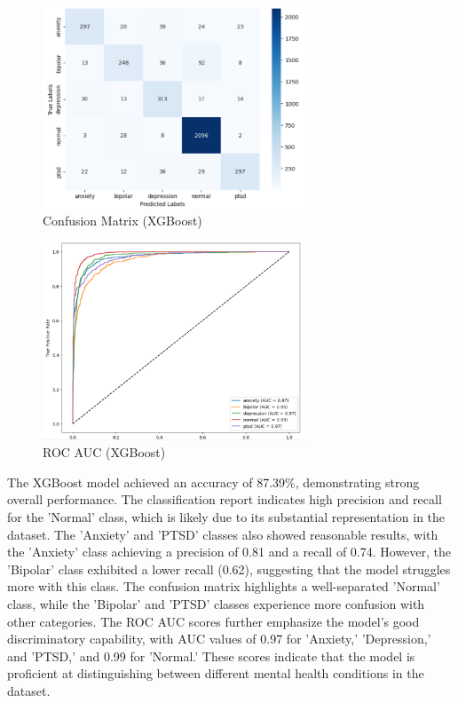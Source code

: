 \vspace{0.25em}

\begin{figure}[h!]  
    \centering
    \includegraphics[width=0.7\textwidth]{Images/XG Confusion Matrix.png}  
    \caption{Confusion Matrix (XGBoost)}
    \label{XGCM}  %
\end{figure}

\begin{figure}[h!]  
    \centering
    \includegraphics[width=0.7\textwidth]{Images/XG ROC.png}  
    \caption{ROC AUC (XGBoost)}
    \label{XGrOC}  %
\end{figure}

\noindent
The XGBoost model achieved an accuracy of 87.39\%, demonstrating strong overall performance. The classification report indicates high precision and recall for the 'Normal' class, which is likely due to its substantial representation in the dataset. The 'Anxiety' and 'PTSD' classes also showed reasonable results, with the 'Anxiety' class achieving a precision of 0.81 and a recall of 0.74. However, the 'Bipolar' class exhibited a lower recall (0.62), suggesting that the model struggles more with this class. The confusion matrix highlights a well-separated 'Normal' class, while the 'Bipolar' and 'PTSD' classes experience more confusion with other categories. The ROC AUC scores further emphasize the model's good discriminatory capability, with AUC values of 0.97 for 'Anxiety,' 'Depression,' and 'PTSD,' and 0.99 for 'Normal.' These scores indicate that the model is proficient at distinguishing between different mental health conditions in the dataset.

